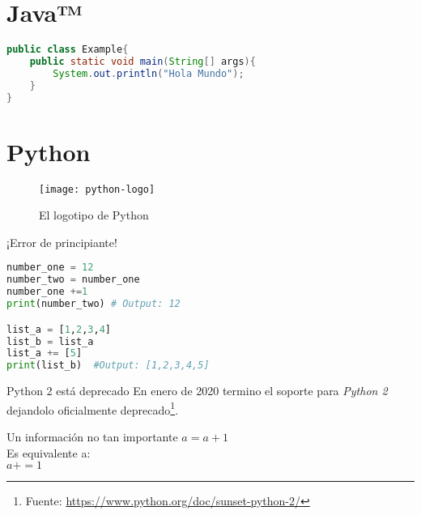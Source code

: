 \section{Java™}

\lipsum[2-3]

\begin{lstlisting}[language=Java, caption={Hola Mundo en Java™}]
public class Example{
    public static void main(String[] args){
        System.out.println("Hola Mundo");
    }
}
\end{lstlisting}

\lipsum[1-2]

\section{Python}

\lipsum[1-2]

\begin{figure}[H]
    \centering
    \texttt{[image: python-logo]}
    \caption{El logotipo de Python}
    \label{fig_1}
\end{figure}

\lipsum[2-3]

\separation
\begin{alertblock}{¡Error de principiante!}
    \lipsum[4-5]

    \separation
\begin{lstlisting}[language=Python, caption={Error en Python}]
number_one = 12
number_two = number_one
number_one +=1
print(number_two) # Output: 12

list_a = [1,2,3,4]
list_b = list_a
list_a += [5]
print(list_b)  #Output: [1,2,3,4,5]
\end{lstlisting}

\end{alertblock}

\separation
\lipsum[2-3]

\separation
\begin{infoblock}{Python 2 está deprecado}
En enero de 2020 termino el soporte para \textit{Python 2} dejandolo oficialmente deprecado\footnote{Fuente: \href{https://www.python.org/doc/sunset-python-2/}{https://www.python.org/doc/sunset-python-2/}}.
\end{infoblock}

\separation
\lipsum[1-2]

\separation
\begin{infoblock*}{Un información no tan importante}
$a = a + 1$ \\
Es equivalente a: \\
$a += 1$
\end{infoblock*}
